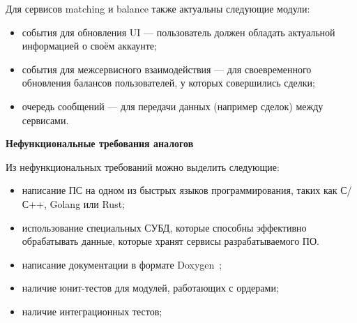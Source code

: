 Для сервисов matching и balance также актуальны следующие модули:
\begin{itemize}
    \item события для обновления UI — пользователь должен обладать актуальной информацией о своём аккаунте;
    \item события для межсервисного взаимодействия — для своевременного обновления балансов пользователей, у которых совершились сделки;
    \item очередь сообщений — для передачи данных (например сделок) между сервисами.
\end{itemize}

\textbf{Нефункциональные требования аналогов}

Из нефункциональных требований можно выделить следующие:
\begin{itemize}
    \item написание ПС на одном из быстрых языков программирования, таких как С/С++, Golang или Rust;
    \item использование специальных СУБД, которые способны эффективно обрабатывать данные, которые хранят сервисы разрабатываемого ПО.
    \item написание документации в формате Doxygen~\cite{doxygen};
    \item наличие юнит-тестов для модулей, работающих с ордерами;
    \item наличие интеграционных тестов;
\end{itemize}
